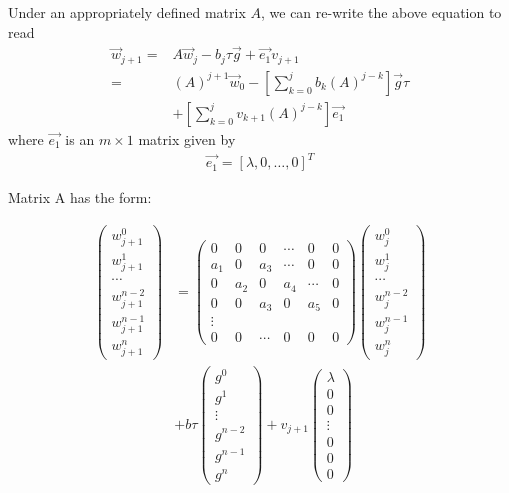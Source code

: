 \documentclass{ifacconf}
\begin{document}
Under an appropriately defined matrix $A$, we can re-write the above equation to read
\begin{align}
	\vec{w}_{j+1} =& A\vec{w}_j - b_j\tau\vec{g} + \vec{e_1}v_{j+1} \\
	=& (A)^{j+1} \vec{w}_0 - \left[ \sum_{k=0}^j b_k (A)^{j-k} \right]\vec{g}\tau \\
	&+ \left[ \sum_{k=0}^j v_{k+1}(A)^{j-k} \right]\vec{e_1} \nonumber
\end{align}
where $\vec{e_1}$ is an $m\times1$ matrix given by
\begin{align}
	\vec{e_1} = \left[ \lambda,0,\dots,0 \right]^T
\end{align}

Matrix A has the form:

\begin{align}
 \begin{pmatrix} w^0_{j+1} \\ w^1_{j+1} \\ \cdots \\ w^{n-2}_{j+1} \\ w^{n-1}_{j+1} \\ w^{n}_{j+1}  \end{pmatrix} &= \left( \begin{matrix}
0 & 0 & 0 & \cdots & 0 & 0 \\
a_{1} & 0 & a_{3} & \cdots & 0 & 0\\
0 & a_{2} & 0 & a_{4} & \cdots & 0\\
0 & 0 & a_{3} & 0 & a_5 & 0\\
\vdots \\
0 & 0 & \cdots &  0 & 0 & 0  \end{matrix} \right) \begin{pmatrix} w^0_j \\ w^1_j \\ \cdots \\ w^{n-2}_j \\ w^{n-1}_j \\ w^{n}_j\end{pmatrix}  \\
&+ b\tau \begin{pmatrix} g^0 \\ g^1 \\ \vdots \\ g^{n-2} \\ g^{n-1} \\ g^{n} \end{pmatrix} + v_{j+1} \begin{pmatrix}
\lambda \\ 0  \\ 0  \\ \vdots \\ 0 \\ 0 \\ 0
\end{pmatrix}
\end{align}
\end{document}
